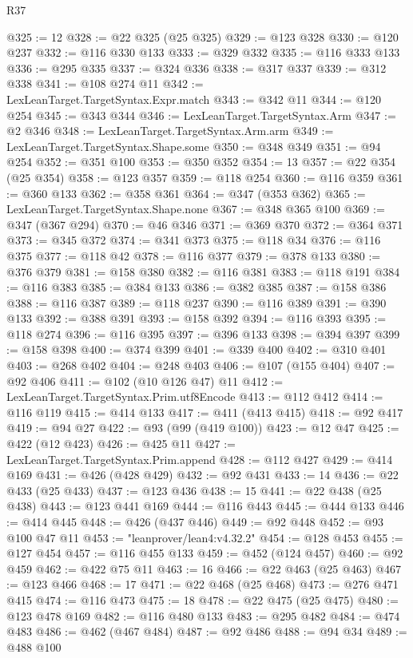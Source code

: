 \begin{lexlean}{R37}
\begin{coremodule}
@325 := 12
@328 := @22 @325 (@25 @325)
@329 := @123 @328
@330 := @120 @237
@332 := @116 @330 @133
@333 := @329 @332
@335 := @116 @333 @133
@336 := @295 @335
@337 := @324 @336
@338 := @317 @337
@339 := @312 @338
@341 := @108 @274 @11
@342 := LexLeanTarget.TargetSyntax.Expr.match
@343 := @342 @11
@344 := @120 @254
@345 := @343 @344
@346 := LexLeanTarget.TargetSyntax.Arm
@347 := @2 @346
@348 := LexLeanTarget.TargetSyntax.Arm.arm
@349 := LexLeanTarget.TargetSyntax.Shape.some
@350 := @348 @349
@351 := @94 @254
@352 := @351 @100
@353 := @350 @352
@354 := 13
@357 := @22 @354 (@25 @354)
@358 := @123 @357
@359 := @118 @254
@360 := @116 @359
@361 := @360 @133
@362 := @358 @361
@364 := @347 (@353 @362)
@365 := LexLeanTarget.TargetSyntax.Shape.none
@367 := @348 @365 @100
@369 := @347 (@367 @294)
@370 := @46 @346
@371 := @369 @370
@372 := @364 @371
@373 := @345 @372
@374 := @341 @373
@375 := @118 @34
@376 := @116 @375
@377 := @118 @42
@378 := @116 @377
@379 := @378 @133
@380 := @376 @379
@381 := @158 @380
@382 := @116 @381
@383 := @118 @191
@384 := @116 @383
@385 := @384 @133
@386 := @382 @385
@387 := @158 @386
@388 := @116 @387
@389 := @118 @237
@390 := @116 @389
@391 := @390 @133
@392 := @388 @391
@393 := @158 @392
@394 := @116 @393
@395 := @118 @274
@396 := @116 @395
@397 := @396 @133
@398 := @394 @397
@399 := @158 @398
@400 := @374 @399
@401 := @339 @400
@402 := @310 @401
@403 := @268 @402
@404 := @248 @403
@406 := @107 (@155 @404)
@407 := @92 @406
@411 := @102 (@10 @126 @47) @11
@412 := LexLeanTarget.TargetSyntax.Prim.utf8Encode
@413 := @112 @412
@414 := @116 @119
@415 := @414 @133
@417 := @411 (@413 @415)
@418 := @92 @417
@419 := @94 @27
@422 := @93 (@99 (@419 @100))
@423 := @12 @47
@425 := @422 (@12 @423)
@426 := @425 @11
@427 := LexLeanTarget.TargetSyntax.Prim.append
@428 := @112 @427
@429 := @414 @169
@431 := @426 (@428 @429)
@432 := @92 @431
@433 := 14
@436 := @22 @433 (@25 @433)
@437 := @123 @436
@438 := 15
@441 := @22 @438 (@25 @438)
@443 := @123 @441 @169
@444 := @116 @443
@445 := @444 @133
@446 := @414 @445
@448 := @426 (@437 @446)
@449 := @92 @448
@452 := @93 @100 @47 @11
@453 := "leanprover/lean4:v4.32.2"
@454 := @128 @453
@455 := @127 @454
@457 := @116 @455 @133
@459 := @452 (@124 @457)
@460 := @92 @459
@462 := @422 @75 @11
@463 := 16
@466 := @22 @463 (@25 @463)
@467 := @123 @466
@468 := 17
@471 := @22 @468 (@25 @468)
@473 := @276 @471 @415
@474 := @116 @473
@475 := 18
@478 := @22 @475 (@25 @475)
@480 := @123 @478 @169
@482 := @116 @480 @133
@483 := @295 @482
@484 := @474 @483
@486 := @462 (@467 @484)
@487 := @92 @486
@488 := @94 @34
@489 := @488 @100

\end{coremodule}
\end{lexlean}
